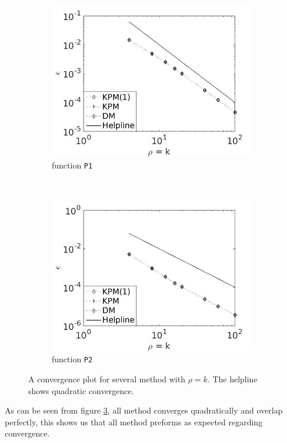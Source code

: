 \begin{figure}[H]
        \centering
        \begin{subfigure}[b]{0.45\textwidth}
                \includegraphics[width=\textwidth]{fig/s1conv1}
                \caption{function \texttt{P1}}
                \label{fig:conv1}
        \end{subfigure}%
~
        \begin{subfigure}[b]{0.45\textwidth}
                \includegraphics[width=\textwidth]{fig/s2conv2}
                \caption{function \texttt{P2}}
                \label{fig:conv2}
        \end{subfigure}
        \caption{A convergence plot for several method with $\rho = k$. The helpline shows quadratic convergence.}\label{fig:conv}
\end{figure}
As can be seen from figure \ref{fig:conv}, all method converges quadratically and overlap perfectly, this shows us that all method preforms as expected regarding convergence.
